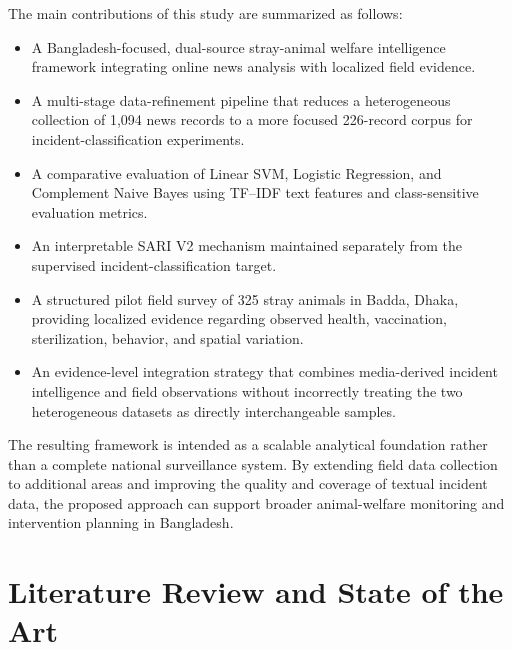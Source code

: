 \documentclass[conference]{IEEEtran}
\begin{document}
The main contributions of this study are summarized as follows:
\begin{itemize}
    \item A Bangladesh-focused, dual-source stray-animal welfare intelligence
    framework integrating online news analysis with localized field evidence.
    
    \item A multi-stage data-refinement pipeline that reduces a heterogeneous
    collection of 1,094 news records to a more focused 226-record corpus for
    incident-classification experiments.
    
    \item A comparative evaluation of Linear SVM, Logistic Regression, and
    Complement Naive Bayes using TF--IDF text features and class-sensitive
    evaluation metrics.
    
    \item An interpretable SARI V2 mechanism maintained separately from the
    supervised incident-classification target.
    
    \item A structured pilot field survey of 325 stray animals in Badda,
    Dhaka, providing localized evidence regarding observed health,
    vaccination, sterilization, behavior, and spatial variation.
    
    \item An evidence-level integration strategy that combines media-derived
    incident intelligence and field observations without incorrectly treating
    the two heterogeneous datasets as directly interchangeable samples.
\end{itemize}

The resulting framework is intended as a scalable analytical foundation rather
than a complete national surveillance system. By extending field data
collection to additional areas and improving the quality and coverage of
textual incident data, the proposed approach can support broader animal-welfare
monitoring and intervention planning in Bangladesh.


\section{Literature Review and State of the Art}
\end{document}
